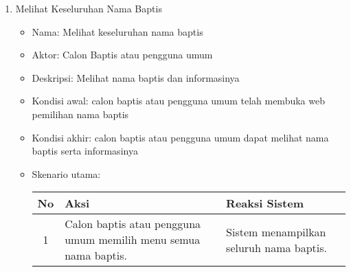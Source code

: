 \documentclass[a4paper,twoside]{article}
\begin{document}
\begin{enumerate}
\begin{enumerate}
\begin{enumerate}

                        \item Melihat Keseluruhan Nama Baptis

                         \begin{itemize}
                                        \item Nama: Melihat keseluruhan nama baptis
                                        \item Aktor: Calon Baptis atau pengguna umum
                                        \item Deskripsi: Melihat nama baptis dan informasinya
                                        \item Kondisi awal: calon baptis atau pengguna umum telah membuka web pemilihan nama baptis  %
                                        \item Kondisi akhir: calon baptis atau pengguna umum dapat melihat nama baptis serta informasinya %
                                        \item Skenario utama:														
				
				\begin{center}
			  \begin{tabular}{ | c | p{5cm} |p{5cm} |}
			    \hline
			    No  & Aksi & Reaksi Sistem\\ \hline 
				1 & Calon baptis atau pengguna umum memilih menu semua nama baptis.%
				&  Sistem menampilkan seluruh nama baptis.\\ \hline 
			    \end{tabular}
			\end{center} 


\end{itemize}
\end{enumerate}
\end{enumerate}
\end{enumerate}
\end{document}
